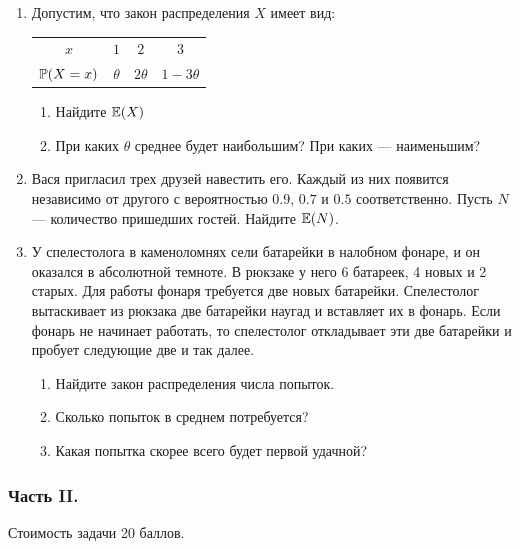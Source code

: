 \begin{enumerate}
\item Допустим, что закон распределения $X$ имеет вид:

\begin{center}
\begin{tabular}{@{}cccc@{}}
\toprule
$x$    & $1$      & $2$       & $3$         \\
$\P(X=x)$ & $\theta$ & $2\theta$ & $1-3\theta$ \\ \bottomrule
\end{tabular}
\end{center}

\begin{enumerate}
\item Найдите $\E(X)$ %
\item При каких $\theta$ среднее будет наибольшим? При каких — наименьшим?
\end{enumerate}

\item Вася пригласил трех друзей навестить его. Каждый из них появится независимо
от другого с вероятностью $0.9$, $0.7$ и $0.5$ соответственно. Пусть $N$ — количество
пришедших гостей. Найдите $\E(N)$.

\item У спелестолога в каменоломнях сели батарейки в налобном фонаре, и он оказался
в абсолютной темноте. В рюкзаке у него 6 батареек, 4 новых и 2 старых. Для работы
фонаря требуется две новых батарейки. Спелестолог вытаскивает из рюкзака две батарейки
наугад и вставляет их в фонарь. Если фонарь не начинает работать, то спелестолог
откладывает эти две батарейки и пробует следующие две и так далее.
\begin{enumerate}
\item Найдите закон распределения числа попыток.
\item Сколько попыток в среднем потребуется?
\item Какая попытка скорее всего будет первой удачной?
\end{enumerate}
\end{enumerate}

\subsubsection*{Часть II.}

Стоимость задачи 20 баллов.


